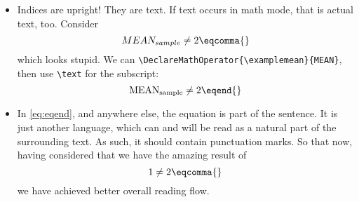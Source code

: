 \begin{itemize}
	Yet, what did we \emph{mean} to be doing?
	We \emph{mean} to \emph{emphasize}; italic text is just what it happens to look like now, but it is not the \emph{meaning}.
	For example, we could later decide to redefine emphasized text to bold.
	If you previously did not differentiate strictly enough between \verb|\emph| and \verb|\textit|, you are in for a bad time.
	\item Indices are upright!
	They are text.
	If text occurs in math mode, that is actual text, too.
	Consider
	\begin{equation*}
		MEAN_{sample} \neq 2\eqcomma{}
	\end{equation*}
	which looks stupid.
	We can \verb|\DeclareMathOperator{\examplemean}{MEAN}|, then use \verb|\text| for the subscript:
	\begin{equation}\label{eq:eqend}
		\examplemean_{\text{sample}} \neq 2 \eqend{}
	\end{equation}
	\item In \cref{eq:eqend}, and anywhere else, the equation is part of the sentence.
	It is just another language, which can and will be read as a natural part of the surrounding text.
	As such, it should contain punctuation marks.
	So that now, having considered that we have the amazing result of
	\begin{equation}
		1 \neq 2 \eqcomma{}
	\end{equation}
	we have achieved better overall reading flow.
\end{itemize}